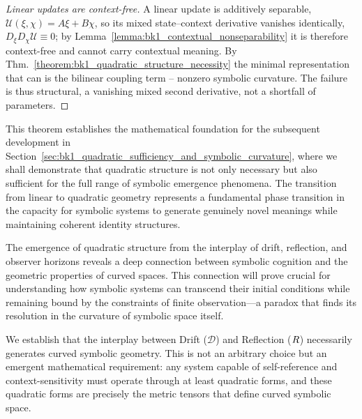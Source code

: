\begin{proof}[Linear updates are context-free]
\label{proof:bk1_linear_insufficiency}
\leavevmode
A linear update is additively separable, $\mathcal{U}(\xi,\chi)=A\xi+B\chi$, so its mixed
state--context derivative vanishes identically, $D_\xi D_\chi\mathcal{U}\equiv 0$; by
Lemma~\ref{lemma:bk1_contextual_nonseparability} it is therefore context-free and cannot
carry contextual meaning. By Thm.~\ref{theorem:bk1_quadratic_structure_necessity} the
minimal representation that can is the bilinear coupling term -- nonzero symbolic
curvature. The failure is thus structural, a vanishing mixed second derivative, not a
shortfall of parameters.
\end{proof}

This theorem establishes the mathematical foundation for the subsequent development in Section~\ref{sec:bk1_quadratic_sufficiency_and_symbolic_curvature}, where we shall demonstrate that quadratic structure is not only necessary but also sufficient for the full range of symbolic emergence phenomena. The transition from linear to quadratic geometry represents a fundamental phase transition in the capacity for symbolic systems to generate genuinely novel meanings while maintaining coherent identity structures.

The emergence of quadratic structure from the interplay of drift, reflection, and observer horizons reveals a deep connection between symbolic cognition and the geometric properties of curved spaces. This connection will prove crucial for understanding how symbolic systems can transcend their initial conditions while remaining bound by the constraints of finite observation—a paradox that finds its resolution in the curvature of symbolic space itself.

We establish that the interplay between Drift ($\mathcal{D}$) and Reflection ($R$) necessarily generates curved symbolic geometry. This is not an arbitrary choice but an emergent mathematical requirement: any system capable of self-reference and context-sensitivity must operate through at least quadratic forms, and these quadratic forms are precisely the metric tensors that define curved symbolic space.

